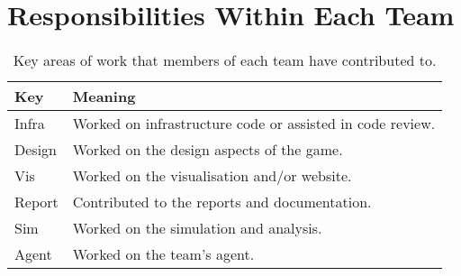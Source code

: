 \section{Responsibilities Within Each Team}
\label{sec:roles_appendix:individual}

\begin{table}[!h]
    \centering
    \begin{tabular}{|l|l|}
    \hline
    \textbf{Key}    & \textbf{Meaning}                               \\ \hline
    Infra  & Worked on infrastructure code or assisted in code review. \\
    Design & Worked on the design aspects of the game.                         \\
    Vis    & Worked on the visualisation and/or website.                      \\
    Report & Contributed to the reports and documentation.                              \\
    Sim    & Worked on the simulation and analysis.                    \\
    Agent  & Worked on the team's agent.                                 \\ \hline
    \end{tabular}
    \caption{Key areas of work that members of each team have contributed to.}
    \label{table:roles_appendix:ind}
    \end{table}







